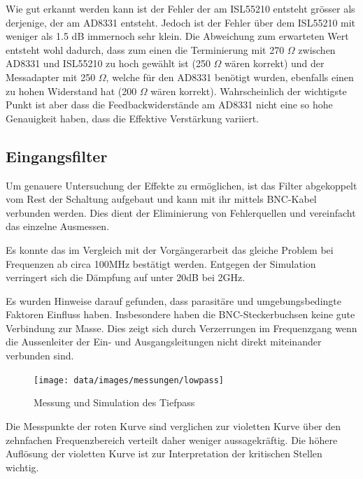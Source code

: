 Wie gut erkannt werden kann ist der Fehler der am ISL55210 entsteht grösser als derjenige, der am AD8331 entsteht. Jedoch ist der Fehler über dem ISL55210 mit weniger als 1.5 dB immernoch sehr klein. Die Abweichung zum erwarteten Wert entsteht wohl dadurch, dass zum einen die Terminierung mit 270 $\Omega$ zwischen AD8331 und ISL55210 zu hoch gewählt ist (250 $\Omega$ wären korrekt) und der Messadapter mit 250 $\Omega$, welche für den AD8331 benötigt wurden, ebenfalls einen zu hohen Widerstand hat (200 $\Omega$ wären korrekt). Wahrscheinlich der wichtigste Punkt ist aber dass die Feedbackwiderstände am AD8331 nicht eine so hohe Genauigkeit haben, dass die Effektive Verstärkung variiert.

\subsection{Eingangsfilter}
Um genauere Untersuchung der Effekte zu ermöglichen, ist das Filter abgekoppelt vom Rest der Schaltung aufgebaut und kann mit ihr mittels BNC-Kabel verbunden werden. Dies dient der Eliminierung von Fehlerquellen und vereinfacht das einzelne Ausmessen.

Es konnte das im Vergleich mit der Vorgängerarbeit das gleiche Problem bei Frequenzen ab circa 100MHz bestätigt werden. Entgegen der Simulation verringert sich die Dämpfung auf unter 20dB bei 2GHz.

Es wurden Hinweise darauf gefunden, dass parasitäre und umgebungsbedingte Faktoren Einfluss haben. Insbesondere haben die BNC-Steckerbuchsen keine gute Verbindung zur Masse. Dies zeigt sich durch Verzerrungen im Frequenzgang wenn die Aussenleiter der Ein- und Ausgangsleitungen nicht direkt miteinander verbunden sind.

\begin{figure}[H]
	\begin{center}
		\texttt{[image: data/images/messungen/lowpass]}
		\caption{Messung und Simulation des Tiefpass}
		\label{fig:lowpass-plot}
	\end{center}
\end{figure}

Die Messpunkte der roten Kurve sind verglichen zur violetten Kurve über den zehnfachen Frequenzbereich verteilt daher weniger aussagekräftig. Die höhere Auflösung der violetten Kurve ist zur Interpretation der kritischen Stellen wichtig.
